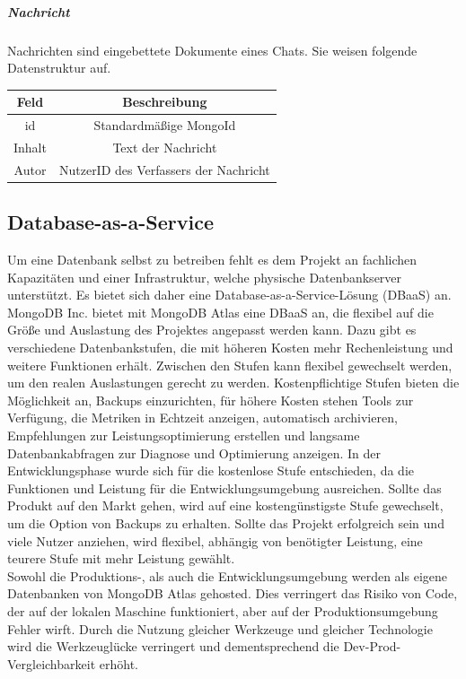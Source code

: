 \subparagraph{Nachricht\\}
Nachrichten sind eingebettete Dokumente eines Chats. Sie weisen folgende Datenstruktur auf.
\begin{center}
    \begin{tabular}{ |c|c| }
        \hline
        Feld & Beschreibung  \\
        \hline
        id & Standardmäßige MongoId \\
        Inhalt & Text der Nachricht \\
        Autor & NutzerID des Verfassers der Nachricht \\
        \hline
    \end{tabular}
\end{center}

\subsection{Database-as-a-Service}
Um eine Datenbank selbst zu betreiben fehlt es dem Projekt an fachlichen Kapazitäten und einer Infrastruktur, welche physische Datenbankserver unterstützt. Es bietet sich daher eine Database-as-a-Service-Lösung (DBaaS) an.\\ 
MongoDB Inc. bietet mit MongoDB Atlas eine DBaaS an, die flexibel auf die Größe und Auslastung des Projektes angepasst werden kann. Dazu gibt es verschiedene Datenbankstufen, die mit höheren Kosten mehr Rechenleistung und weitere Funktionen erhält. Zwischen den Stufen kann flexibel gewechselt werden, um den realen Auslastungen gerecht zu werden. Kostenpflichtige Stufen bieten die Möglichkeit an, Backups einzurichten, für höhere Kosten stehen Tools zur Verfügung, die Metriken in Echtzeit anzeigen, automatisch archivieren, Empfehlungen zur Leistungsoptimierung erstellen und langsame Datenbankabfragen zur Diagnose und Optimierung anzeigen. In der Entwicklungsphase wurde sich für die kostenlose Stufe entschieden, da die Funktionen und Leistung für die Entwicklungsumgebung ausreichen. Sollte das Produkt auf den Markt gehen, wird auf eine kostengünstigste Stufe gewechselt, um die Option von Backups zu erhalten. Sollte das Projekt erfolgreich sein und viele Nutzer anziehen, wird flexibel, abhängig von benötigter Leistung, eine teurere Stufe mit mehr Leistung gewählt.\\
Sowohl die Produktions-, als auch die Entwicklungsumgebung werden als eigene Datenbanken von MongoDB Atlas gehosted. Dies verringert das Risiko von Code, der auf der lokalen Maschine funktioniert, aber auf der Produktionsumgebung Fehler wirft. Durch die Nutzung gleicher Werkzeuge und gleicher Technologie wird die Werkzeuglücke verringert und dementsprechend die Dev-Prod-Vergleichbarkeit erhöht. \cite{12FA-10}

